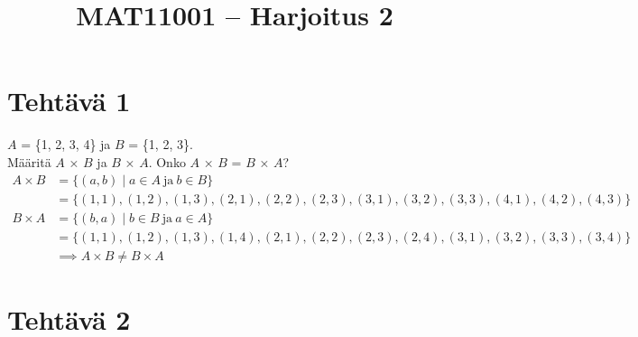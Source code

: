 \documentclass{article}
\begin{document}
	
	\title{MAT11001 – Harjoitus 2}
	\date{}
	\maketitle
	
	
	\section*{Tehtävä 1}
    \(A\) = \{1, 2, 3, 4\} ja \(B\) = \{1, 2, 3\}. \\[10pt]
    Määritä \(A\) × \(B\) ja \(B\) × \(A\).
    Onko \(A\) × \(B\) = \(B\) × \(A\)?\\
	\[
	\begin{aligned}
	A \times B &= \{(a,b) \mid a \in A \ \text{ja} \ b \in B\} \\
	&= \{(1,1), (1,2), (1,3), (2,1), (2,2),(2,3),(3,1), (3,2),(3,3), (4,1), (4,2),(4,3)\} \\[10pt]
    B \times A &= \{(b,a) \mid b \in B \ \text{ja} \ a \in A\} \\
    &= \{(1,1), (1,2), (1,3), (1,4), (2,1),(2,2),(2,3), (2,4),(3,1), (3,2), (3,3),(3,4)\}  \\[10pt]
    &\implies A \times B \neq  B \times A
    \end{aligned}
    \] 
	\vspace{20pt}
	\section*{Tehtävä 2}
    
    
\end{document}
